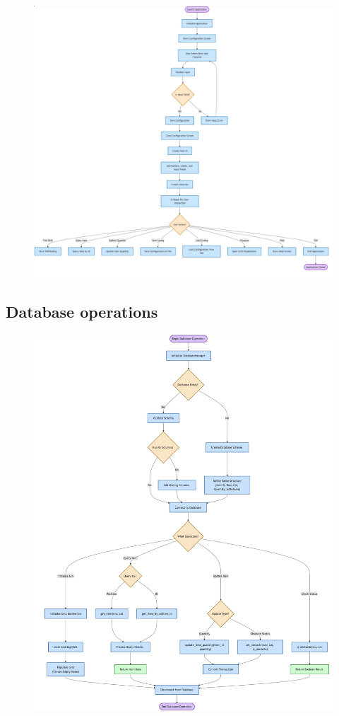 \begin{figure}[htbp]
	\centering
	\includegraphics[width=1\linewidth]{Flowcharts/guiflowchart.png}
	
\end{figure}

\newpage

\subsection{Database operations}

\begin{figure}[htbp]
    \centering
    \includegraphics[width=0.91\linewidth]{Flowcharts/dbops1.png}

\end{figure}

